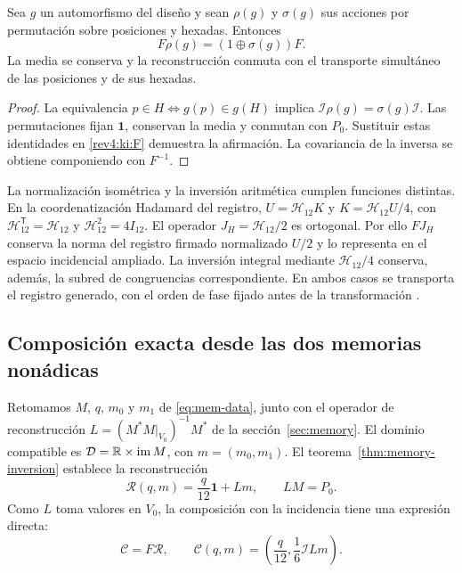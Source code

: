 \begin{proposition}
\label{rev4:ki:equivariance}
Sea \(g\) un automorfismo del diseño y sean \(\rho(g)\) y
\(\sigma(g)\) sus acciones por permutación sobre posiciones y
hexadas. Entonces
\[
 F\rho(g)=(1\oplus\sigma(g))F.
\]
La media se conserva y la reconstrucción conmuta con el transporte
simultáneo de las posiciones y de sus hexadas.
\end{proposition}
\begin{proof}
La equivalencia \(p\in H\Longleftrightarrow g(p)\in g(H)\)
implica \(\mathcal I\rho(g)=\sigma(g)\mathcal I\).
Las permutaciones fijan \(\mathbf1\), conservan la media y
conmutan con \(P_0\). Sustituir estas identidades en
\eqref{rev4:ki:F} demuestra la afirmación. La covariancia de la
inversa se obtiene componiendo con \(F^{-1}\).
\end{proof}

La normalización isométrica y la inversión aritmética cumplen
funciones distintas. En la coordenatización Hadamard del registro,
\(U=\mathcal H_{12}K\) y
\(K=\mathcal H_{12}U/4\), con
\(\mathcal H_{12}^{\mathsf T}=\mathcal H_{12}\) y
\(\mathcal H_{12}^2=4I_{12}\).
El operador \(J_H=\mathcal H_{12}/2\) es ortogonal. Por ello
\(FJ_H\) conserva la norma del registro firmado normalizado
\(U/2\) y lo representa en el espacio incidencial ampliado.
La inversión integral mediante \(\mathcal H_{12}/4\) conserva,
además, la subred de congruencias correspondiente. En ambos casos se
transporta el registro generado, con el orden de fase fijado antes
de la transformación \cite{hmtX}.

\subsection{Composición exacta desde las dos memorias nonádicas}
\label{rev4:ki:memory-subsection}

Retomamos \(M\), \(q\), \(m_0\) y \(m_1\)
de \eqref{eq:mem-data}, junto con el operador de reconstrucción
\(L=(M^*M|_{V_0})^{-1}M^*\) de la sección~\ref{sec:memory}.
El dominio compatible es
\(\mathcal D=\mathbb R\times\operatorname{im}M\), con
\(m=(m_0,m_1)\). El teorema~\ref{thm:memory-inversion}
establece la reconstrucción
\[
 \mathcal R(q,m)=\frac q{12}\mathbf1+Lm,
 \qquad LM=P_0.
\]
Como \(L\) toma valores en \(V_0\), la composición con la
incidencia tiene una expresión directa:
\begin{equation}
 \mathcal C=F\mathcal R,\qquad
 \mathcal C(q,m)=\left(\frac q{12},\frac16\mathcal I Lm\right).
 \label{rev4:ki:memory-incidence}
\end{equation}

